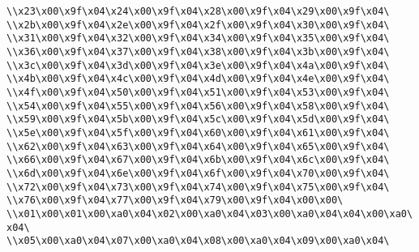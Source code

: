\verb|\\x23\x00\x9f\x04\x24\x00\x9f\x04\x28\x00\x9f\x04\x29\x00\x9f\x04\|\newline
\verb|\\x2b\x00\x9f\x04\x2e\x00\x9f\x04\x2f\x00\x9f\x04\x30\x00\x9f\x04\|\newline
\verb|\\x31\x00\x9f\x04\x32\x00\x9f\x04\x34\x00\x9f\x04\x35\x00\x9f\x04\|\newline
\verb|\\x36\x00\x9f\x04\x37\x00\x9f\x04\x38\x00\x9f\x04\x3b\x00\x9f\x04\|\newline
\verb|\\x3c\x00\x9f\x04\x3d\x00\x9f\x04\x3e\x00\x9f\x04\x4a\x00\x9f\x04\|\newline
\verb|\\x4b\x00\x9f\x04\x4c\x00\x9f\x04\x4d\x00\x9f\x04\x4e\x00\x9f\x04\|\newline
\verb|\\x4f\x00\x9f\x04\x50\x00\x9f\x04\x51\x00\x9f\x04\x53\x00\x9f\x04\|\newline
\verb|\\x54\x00\x9f\x04\x55\x00\x9f\x04\x56\x00\x9f\x04\x58\x00\x9f\x04\|\newline
\verb|\\x59\x00\x9f\x04\x5b\x00\x9f\x04\x5c\x00\x9f\x04\x5d\x00\x9f\x04\|\newline
\verb|\\x5e\x00\x9f\x04\x5f\x00\x9f\x04\x60\x00\x9f\x04\x61\x00\x9f\x04\|\newline
\verb|\\x62\x00\x9f\x04\x63\x00\x9f\x04\x64\x00\x9f\x04\x65\x00\x9f\x04\|\newline
\verb|\\x66\x00\x9f\x04\x67\x00\x9f\x04\x6b\x00\x9f\x04\x6c\x00\x9f\x04\|\newline
\verb|\\x6d\x00\x9f\x04\x6e\x00\x9f\x04\x6f\x00\x9f\x04\x70\x00\x9f\x04\|\newline
\verb|\\x72\x00\x9f\x04\x73\x00\x9f\x04\x74\x00\x9f\x04\x75\x00\x9f\x04\|\newline
\verb|\\x76\x00\x9f\x04\x77\x00\x9f\x04\x79\x00\x9f\x04\x00\x00\|\newline
\verb|\\x01\x00\x01\x00\xa0\x04\x02\x00\xa0\x04\x03\x00\xa0\x04\x04\x00\xa0\x04\|\newline
\verb|\\x05\x00\xa0\x04\x07\x00\xa0\x04\x08\x00\xa0\x04\x09\x00\xa0\x04\|\newline
